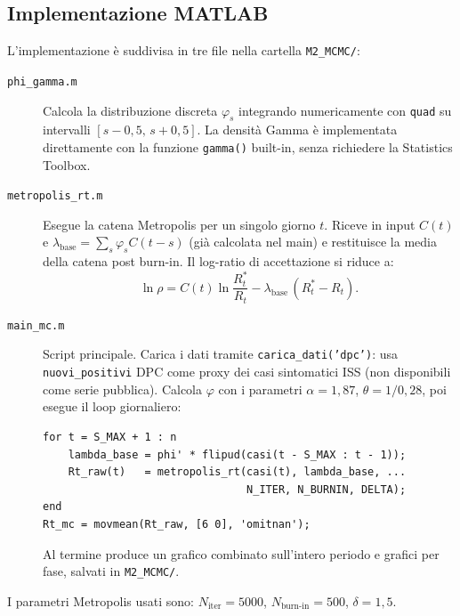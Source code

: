 \documentclass[12pt, a4paper]{article}
\begin{document}
\subsection{Implementazione MATLAB}

L'implementazione è suddivisa in tre file nella cartella \texttt{M2\_MCMC/}:

\begin{description}
    \item[\texttt{phi\_gamma.m}] Calcola la distribuzione discreta $\varphi_s$ integrando
        numericamente con \texttt{quad} su intervalli $[s-0{,}5,\, s+0{,}5]$.
        La densità Gamma è implementata direttamente con la funzione \texttt{gamma()} built-in,
        senza richiedere la Statistics Toolbox.

    \item[\texttt{metropolis\_rt.m}] Esegue la catena Metropolis per un singolo giorno $t$.
        Riceve in input $C(t)$ e $\lambda_{\text{base}} = \sum_s \varphi_s C(t-s)$
        (già calcolata nel main) e restituisce la media della catena post burn-in.
        Il log-ratio di accettazione si riduce a:
        \begin{equation*}
            \ln\rho = C(t)\ln\!\frac{R_t^*}{R_t} - \lambda_{\text{base}}\,(R_t^* - R_t).
        \end{equation*}

    \item[\texttt{main\_mc.m}] Script principale. Carica i dati tramite
        \texttt{carica\_dati('dpc')}: usa \texttt{nuovi\_positivi} DPC come
        proxy dei casi sintomatici ISS (non disponibili come serie pubblica).
        Calcola $\varphi$ con i parametri $\alpha=1{,}87$, $\theta=1/0{,}28$,
        poi esegue il loop giornaliero:
        \begin{lstlisting}[style=matlab, caption={Nucleo del calcolo in \texttt{main\_mc.m}.}]
for t = S_MAX + 1 : n
    lambda_base = phi' * flipud(casi(t - S_MAX : t - 1));
    Rt_raw(t)   = metropolis_rt(casi(t), lambda_base, ...
                                N_ITER, N_BURNIN, DELTA);
end
Rt_mc = movmean(Rt_raw, [6 0], 'omitnan');
        \end{lstlisting}
        Al termine produce un grafico combinato sull'intero periodo
        e grafici per fase, salvati in \texttt{M2\_MCMC/}.
\end{description}

I parametri Metropolis usati sono: $N_{\text{iter}} = 5000$, $N_{\text{burn-in}} = 500$,
$\delta = 1{,}5$.
\end{document}
